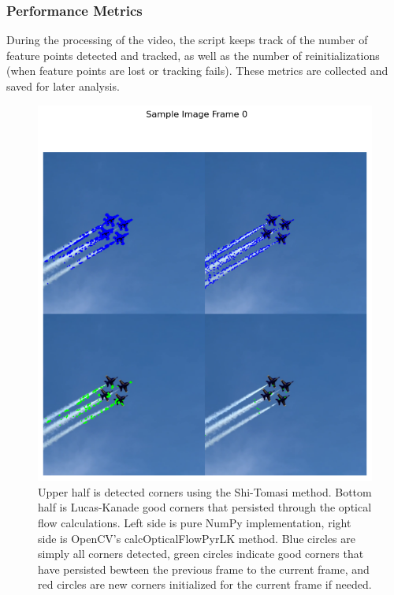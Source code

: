 \documentclass[11pt, conference, letterpaper]{IEEEtran}
\begin{document}
\subsubsection{Performance Metrics}
During the processing of the video, the script keeps track of the number of feature points detected and tracked, as well as the number of reinitializations (when feature points are lost or tracking fails). These metrics are collected and saved for later analysis.
\bigskip

\onecolumn
\begin{figure}[t]
    \centering
    \includegraphics[width=0.8\linewidth]{images/sample_image_0.png}
    \caption{Upper half is detected corners using the Shi-Tomasi method. Bottom half is Lucas-Kanade good corners that persisted through the optical flow calculations. Left side is pure NumPy implementation, right side is OpenCV's calcOpticalFlowPyrLK method. Blue circles are simply all corners detected, green circles indicate good corners that have persisted bewteen the previous frame to the current frame, and red circles are new corners initialized for the current frame if needed.}
    \label{fig:sample_1}
\end{figure}
\end{document}
